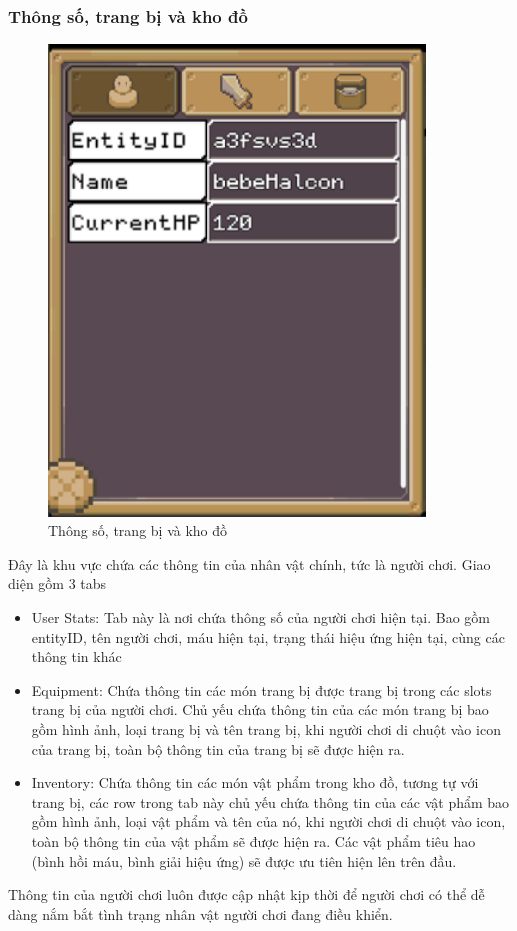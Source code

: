 \subsubsection{Thông số, trang bị và kho đồ}
\begin{figure}[H]
	\centering
	\includegraphics[width=10cm]{Images/Inventory.png}
	\vspace{0.5cm}
	\caption{Thông số, trang bị và kho đồ}
\end{figure}
\hspace*{1cm} Đây là khu vực chứa các thông tin của nhân vật chính, tức là người chơi. Giao diện gồm 3 tabs
\begin{itemize}
	\item User Stats: Tab này là nơi chứa thông số của người chơi hiện tại. Bao gồm entityID, tên người chơi, máu hiện tại, trạng thái hiệu ứng hiện tại, cùng các thông tin khác
	\item Equipment: Chứa thông tin các món trang bị được trang bị trong các slots trang bị của người chơi. Chủ yếu chứa thông tin của các món trang bị bao gồm hình ảnh, loại trang bị và tên trang bị, khi người chơi di chuột vào icon của trang bị, toàn bộ thông tin của trang bị sẽ được hiện ra.
	\item Inventory: Chứa thông tin các món vật phẩm trong kho đồ, tương tự với trang bị, các row trong tab này chủ yếu chứa thông tin của các vật phẩm bao gồm hình ảnh, loại vật phẩm và tên của nó, khi người chơi di chuột vào icon, toàn bộ thông tin của vật phẩm sẽ được hiện ra. Các vật phẩm tiêu hao (bình hồi máu, bình giải hiệu ứng) sẽ được ưu tiên hiện lên trên đầu.
\end{itemize}
\hspace*{1cm} Thông tin của người chơi luôn được cập nhật kịp thời để người chơi có thể dễ dàng nắm bắt tình trạng nhân vật người chơi đang điều khiển.
